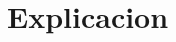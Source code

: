 \documentclass[a4paper,10pt, nofootinbib]{article}
\begin{document}
\maketitle

\tableofcontents
\clearpage

\thispagestyle{empty}


\clearpage

\section{Explicacion}

\clearpage

\clearpage
\end{document}
